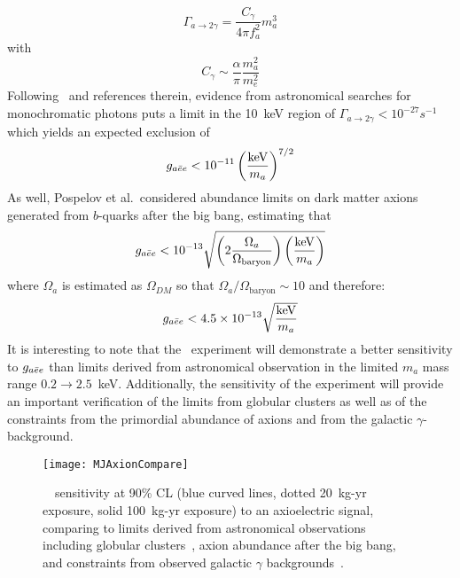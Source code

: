 			\begin{equation}
				\Gamma_{a \to 2 \gamma} = \frac{C_\gamma}{4 \pi f_a^2} m_a^3
			\end{equation}
with
			\begin{equation}
				C_\gamma \sim \frac{\alpha}{\pi} \frac{m_{a}^{2}}{m_{e}^{2}}
			\end{equation}
Following~\cite{Pospelov:2008jk} and references therein, evidence from astronomical searches for monochromatic photons puts a limit in the 10~keV region of $\Gamma_{a \to 2 \gamma} < 10^{-27} s^{-1}$ which yields an expected exclusion of 
			\begin{equation}
				g_{a\bar{e}e} < 10^{-11} \left(\frac{\text{keV}}{m_{a}}\right)^{7/2}
			\end{equation}
As well, Pospelov et al.~considered abundance limits on dark matter axions generated from $b$-quarks after the big bang, estimating that 
			\begin{equation}
				g_{a\bar{e}e} < 10^{-13} \sqrt{
					\left( 2 \frac{\Omega_a}{\Omega_{\text{baryon}}} \right)
					\left( \frac{\text{keV}}{m_a}\right)
				}
			\end{equation}
where $\Omega_{a}$ is estimated as $\Omega_{DM}$ so that $\Omega_a/\Omega_{\text{baryon}} \sim 10$ and therefore:
			\begin{equation}
				g_{a\bar{e}e} < 4.5 \times 10^{-13} \sqrt{\frac{\text{keV}}{m_a}}
			\end{equation}
	It is interesting to note that the \MJ~experiment will demonstrate a better sensitivity to $g_{a\bar{e}e}$ than limits derived from astronomical observation in the limited $m_{a}$ mass range $0.2\to2.5$~keV.  Additionally, the sensitivity of the experiment will provide an important verification of the limits from globular clusters as well as of the constraints from the primordial abundance of axions and from the galactic $\gamma$-background.
					
			\begin{figure}
				\centering
				\texttt{[image: MJAxionCompare]}
				\caption[Sensitivity comparison to limits from cosmology and astronomical observation]
				{\MJ~\minmod~sensitivity at 90\% CL (blue curved lines, dotted 20~kg-yr exposure, solid 100~kg-yr exposure) to an axioelectric signal, 
				comparing to limits derived from astronomical observations including globular clusters~\cite{Raffelt95}, 
				axion abundance after the big bang, and constraints from observed galactic $\gamma$ 
				backgrounds~\cite{Pospelov:2008jk}.}
				\label{fig:MJSensitivityToHeavyAxionsCompare}
			\end{figure}							

